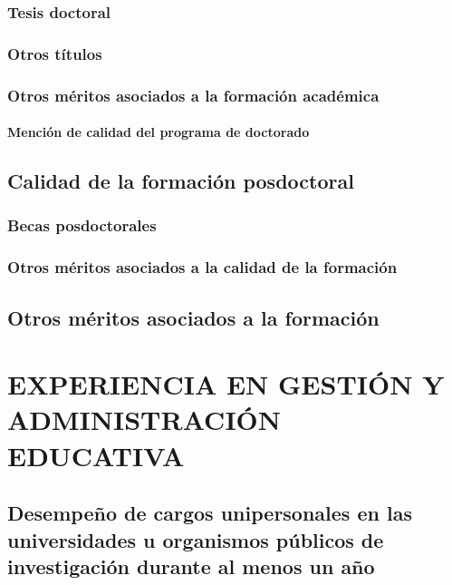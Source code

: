 \documentclass[a4paper, 11pt, twoside, openright]{report}
\begin{document}
\subsection{Tesis doctoral}



\subsection{Otros títulos}

\subsection{Otros méritos asociados a la formación académica}

\subsubsection{Mención de calidad del programa de doctorado}


\section{Calidad de la formación posdoctoral}

\subsection{Becas posdoctorales}

\subsection{Otros méritos asociados a la calidad de la formación}

\section{Otros méritos asociados a la formación}
	

\chapter{EXPERIENCIA EN GESTIÓN Y ADMINISTRACIÓN EDUCATIVA}

\section{Desempeño de cargos unipersonales en las universidades u organismos públicos de investigación durante al menos un año}
\end{document}
